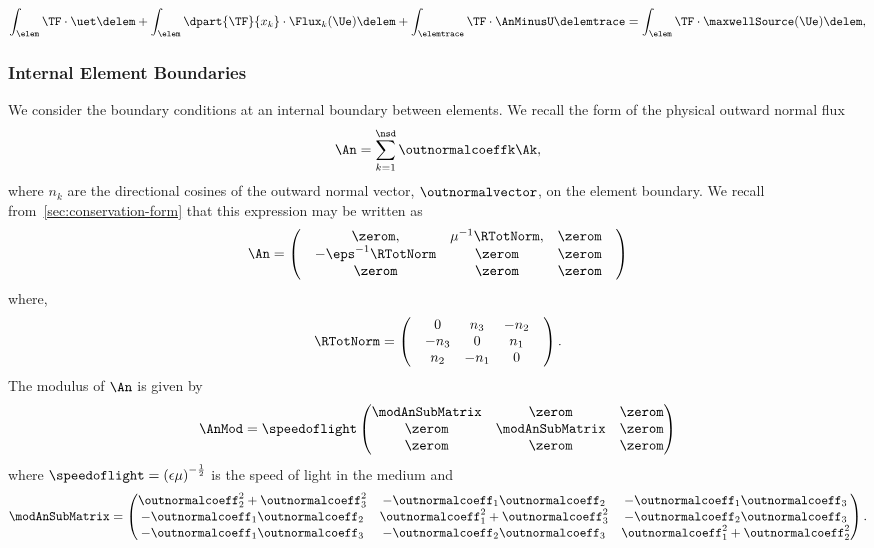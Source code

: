 \begin{equation}
\int_{\elem} \TF \cdot \uet \delem  + \int_{\elem} \dpart{\TF}{x_k} \cdot
\Flux_{k}(\Ue) \delem + \int_{\elemtrace} \TF \cdot \AnMinusU \delemtrace
= \int_{\elem} \TF \cdot \maxwellSource(\Ue) \delem,
\label{eq:weak-form-with-physical-flux}
\end{equation}

\subsubsection{Internal Element Boundaries}
We consider the boundary conditions at an internal boundary between elements. We recall the form of the physical outward normal flux
$$\An = \sum_{k=1}^{\nsd} \outnormalcoeffk \Ak ,$$
where $n_k$ are the directional cosines of the outward normal vector, $\outnormalvector$, on the element boundary. We recall from~\ref{sec:conservation-form} that this expression may be written as
$$
  \An =
  \begin{pmatrix}
 & \zerom , & \mu^{-1} \RTotNorm, & \zerom \\
 & - \eps^{-1} \RTotNorm & \zerom & \zerom \\
 & \zerom & \zerom & \zerom 
 & \end{pmatrix}
$$
where,
$$
  \RTotNorm =
  \begin{pmatrix}
 & 0 & n_3 & -n_2 \\
 & -n_3 & 0 & n_1 \\
& n_2 & -n_1 & 0 
 & \end{pmatrix} .
$$
The modulus of $\An$ is given by
\begin{align*}
\AnMod = \speedoflight
\begin{pmatrix}
  \modAnSubMatrix & \zerom & \zerom \\
  \zerom  & \modAnSubMatrix & \zerom \\
   \zerom & \zerom & \zerom 
\end{pmatrix}
\end{align*}
where $\speedoflight = \left( \epsilon \mu  \right)^{-\frac{1}{2}}$ is the speed of light in the medium and
\begin{align*}
  \modAnSubMatrix = 
\begin{pmatrix}
\outnormalcoeff_2^2 + \outnormalcoeff_3^2 &      -\outnormalcoeff_1 \outnormalcoeff_2 &      -\outnormalcoeff_1 \outnormalcoeff_3 \\
-\outnormalcoeff_1 \outnormalcoeff_2 & \outnormalcoeff_1^2 + \outnormalcoeff_3^2 &      -\outnormalcoeff_2 \outnormalcoeff_3 \\
-\outnormalcoeff_1 \outnormalcoeff_3 &      -\outnormalcoeff_2 \outnormalcoeff_3 & \outnormalcoeff_1^2 + \outnormalcoeff_2^2 \\
\end{pmatrix} .
\end{align*}

